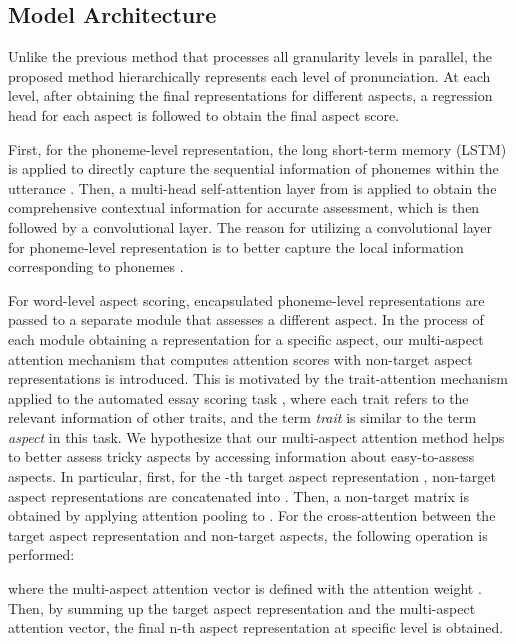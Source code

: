\documentclass{article}
\begin{document}
\subsection{Model Architecture}
Unlike the previous method that processes all granularity levels in parallel, the proposed method hierarchically represents each level of pronunciation. At each level, after obtaining the final representations for different aspects, a regression head for each aspect is followed to obtain the final aspect score.

First, for the phoneme-level representation, the long short-term memory (LSTM) \cite{hochreiter1997long} is applied to directly capture the sequential information of phonemes within the utterance \cite{li2017improving}. Then, a multi-head self-attention layer from \cite{vaswani2017attention} is applied to obtain the comprehensive contextual information for accurate assessment, which is then followed by a convolutional layer. The reason for utilizing a convolutional layer for phoneme-level representation is to better capture the local information corresponding to phonemes \cite{lee2009unsupervised, lee2016language}.

For word-level aspect scoring, encapsulated phoneme-level representations are passed to a separate module that assesses a different aspect. In the process of each module obtaining a representation for a specific aspect, our multi-aspect attention mechanism that computes attention scores with non-target aspect representations is introduced. This is motivated by the trait-attention mechanism applied to the automated essay scoring task \cite{ridley2021automated}, where each trait refers to the relevant information of other traits, and the term \textit{trait} is similar to the term \textit{aspect} in this task. We hypothesize that our multi-aspect attention method helps to better assess tricky aspects by accessing information about easy-to-assess aspects. In particular, first, for the -th target aspect representation , non-target aspect representations  are concatenated into . Then, a non-target matrix  is obtained by applying attention pooling \cite{dong2017attention} to . For the cross-attention between the target aspect representation and non-target aspects, the following operation is performed:
\begin{small}\end{small}
where the multi-aspect attention vector  is defined with the attention weight . Then, by summing up the target aspect representation and the multi-aspect attention vector, the final n-th aspect representation  at specific level is obtained.
\end{document}
